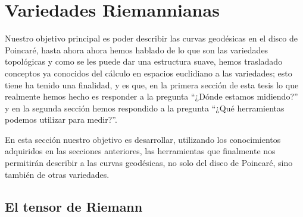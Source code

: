 \section{Variedades Riemannianas}\label{Sección: Variedades Riemannianas}

Nuestro objetivo principal es poder describir las curvas geodésicas en el disco de Poincaré, hasta ahora ahora hemos hablado de lo que son las variedades topológicas y como se les puede dar una estructura suave, hemos trasladado conceptos ya conocidos del cálculo en espacios euclidiano a las variedades; esto tiene ha tenido una finalidad, y es que, en la primera sección de esta tesis lo que realmente hemos hecho es responder a la pregunta \enquote{¿Dónde estamos midiendo?} y en la segunda sección hemos respondido a la pregunta \enquote{¿Qué herramientas podemos utilizar para medir?}. 

En esta sección nuestro objetivo es desarrollar, utilizando los conocimientos adquiridos en las secciones anteriores, las herramientas que finalmente nos permitirán describir a las curvas geodésicas, no solo del disco de Poincaré, sino también de otras variedades.

\subsection{El tensor de Riemann}
